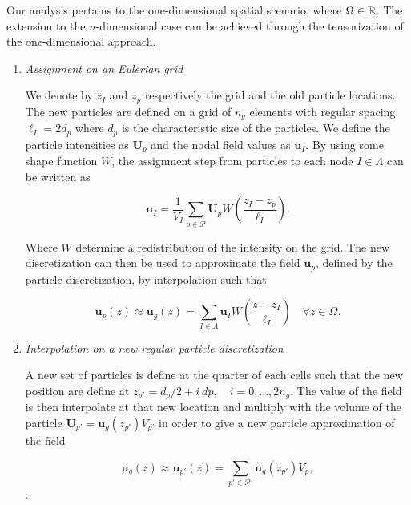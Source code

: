 Our analysis pertains to the one-dimensional spatial scenario, where $\Omega \in \mathbb{R}$. The extension to the $n$-dimensional case can be achieved through the tensorization of the one-dimensional approach.

\begin{enumerate}[label=(\alph*)]
	\item  \textit{Assignment on an Eulerian grid} \label{assigment}

	      We denote by $z_{I}$ and $z_{p}$ respectively the grid and the old particle locations. The new particles are defined on a grid of $n_g$ elements with regular spacing $\ell_I = 2 d_p$ where $d_p$ is the characteristic size of the particles. We define the particle intensities as $\bm U_p$ and the nodal field values as $\bm u_I$. By using some shape function $W$, the assignment step from particles to each node $I \in \Lambda$ can be written as

	      \begin{equation*}
		      \bm{u}_I = \frac1{V_I} \sum_{p \in \mathcal P} \bm U_p  W \left(\frac{z_I - z_p}{\ell_I} \right).
	      \end{equation*}

	      Where $W$ determine a redistribution of the intensity on the grid. The new discretization can then be used to approximate the field $\bm{u}_p$, defined by the particle discretization, by interpolation such that

	      \begin{equation*}
		      \bm{u}_p(z) \approx \bm{u}_g(z) = \sum_{I \in \Lambda} \bm u_I W \left(\frac{z - z_I}{\ell_I} \right) \quad \forall z \in \Omega.
	      \end{equation*}
	\item  \textit{Interpolation on a new regular particle discretization} \label{interpolation}

	      A new set of particles is define at the quarter of each cells such that the new position are define at $z_{p'} = d_p/2 + i~dp, \quad i = 0,\dots, 2n_g $. The value of the field is then interpolate at that new location and multiply with the volume of the particle $\bm{U}_{p'} = \bm  u_g(z_{p'}) V_{p'}$ in order to give a new particle approximation of the field

	      \begin{equation*}
		      \bm{u}_g(z)  \approx \bm{u}_{p'}(z) = \sum_{p'\in\mathcal P'} \bm{u}_g(z_{p'}) V_p,
	      \end{equation*}.
\end{enumerate}

